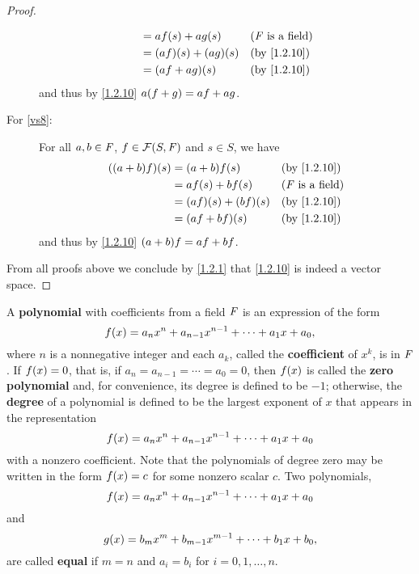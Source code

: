 \begin{proof}
\begin{description}
\begin{align*}
                             & = af\p{s} + ag\p{s}         &  & \text{(\(\F\) is a field)} \\
                             & = \p{af}\p{s} + \p{ag}\p{s} &  & \text{(by \cref{1.2.10})}  \\
                             & = \p{af + ag}\p{s}          &  & \text{(by \cref{1.2.10})}
      \end{align*}
      and thus by \cref{1.2.10} \(a \p{f + g} = af + ag\).
    \item[For \ref{vs8}:]
      For all \(a, b \in \mathit{F}\), \(f \in \FS\) and \(s \in S\), we have
      \begin{align*}
        \p{\p{a + b} f}\p{s} & = \p{a + b} f\p{s}          &  & \text{(by \cref{1.2.10})}  \\
                             & = af\p{s} + bf\p{s}         &  & \text{(\(\F\) is a field)} \\
                             & = \p{af}\p{s} + \p{bf}\p{s} &  & \text{(by \cref{1.2.10})}  \\
                             & = \p{af + bf}\p{s}          &  & \text{(by \cref{1.2.10})}
      \end{align*}
      and thus by \cref{1.2.10} \(\p{a + b} f = af + bf\).
  \end{description}
  From all proofs above we conclude by \cref{1.2.1} that \cref{1.2.10} is indeed a vector space.
\end{proof}

\begin{defn}\label{1.2.11}
  A \textbf{polynomial} with coefficients from a field \(\mathit{F}\) is an expression of the form
  \[
    f\p{x} = a_{n} x^{n} + a_{n - 1} x^{n - 1} + \cdots + a_{1} x + a_{0},
  \]
  where \(n\) is a nonnegative integer and each \(a_{k}\), called the \textbf{coefficient} of \(x^{k}\), is in \(\mathit{F}\).
  If \(f\p{x} = 0\), that is, if \(a_{n} = a_{n - 1} = \cdots = a_{0} = 0\), then \(f\p{x}\) is called the \textbf{zero polynomial} and, for convenience, its degree is defined to be \(-1\);
  otherwise, the \textbf{degree} of a polynomial is defined to be the largest exponent of \(x\) that appears in the representation
  \[
    f\p{x} = a_{n} x^{n} + a_{n - 1} x^{n - 1} + \cdots + a_{1} x + a_{0}
  \]
  with a nonzero coefficient.
  Note that the polynomials of degree zero may be written in the form \(f\p{x} = c\) for some nonzero scalar \(c\).
  Two polynomials,
  \[
    f\p{x} = a_{n} x^{n} + a_{n - 1} x^{n - 1} + \cdots + a_{1} x + a_{0}
  \]
  and
  \[
    g\p{x} = b_{m} x^{m} + b_{m - 1} x^{m - 1} + \cdots + b_{1} x + b_{0},
  \]
  are called \textbf{equal} if \(m = n\) and \(a_i = b_i\) for \(i = 0, 1, \dots, n\).
\end{defn}

